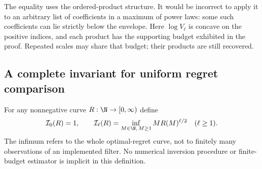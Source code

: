 \documentclass[11pt]{amsart}
\theoremstyle{definition}\newtheorem{definition}[theorem]{Definition}
\theoremstyle{remark}\newtheorem{remark}[theorem]{Remark}
\begin{document}
The equality uses the ordered-product structure. It would be incorrect
to apply it to an arbitrary list of coefficients in a maximum of power
laws: some such coefficients can lie strictly below the envelope. Here
$\log V_\ell$ is concave on the positive indices, and each product
has the supporting budget exhibited in the proof. Repeated scales may
share that budget; their products are still recovered.

\subsection{A complete invariant for uniform regret comparison}
For any nonnegative curve $R:\N\to[0,\infty)$ define
\begin{equation}\label{eq:operational-volume-transform}
 \mathcal I_0(R)=1,\qquad
 \mathcal I_\ell(R)=\inf_{M\in\N,\,M\ge1}
                       M R(M)^{\ell/2}\quad(\ell\ge1).
\end{equation}
The infimum refers to the whole optimal-regret curve, not to finitely
many observations of an implemented filter. No numerical inversion
procedure or finite-budget estimator is implicit in this definition.
\end{document}
